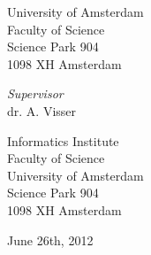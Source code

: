 \begin{center}
University of Amsterdam\\
Faculty of Science\\
Science Park 904\\
1098 XH Amsterdam

\vspace{2cm}

\emph{Supervisor}\\
dr. A. Visser 

\vspace{0.25cm}

Informatics Institute\\
Faculty of Science\\
University of Amsterdam\\
Science Park 904\\
1098 XH Amsterdam\\

\vspace{1.5cm}

June 26th, 2012

\end{center}
\newpage
